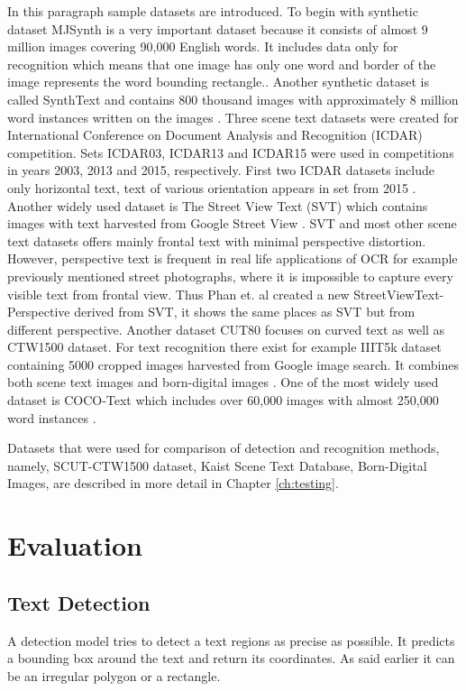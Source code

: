 In this paragraph sample datasets are introduced. To begin with synthetic dataset MJSynth is a very important dataset because it consists of almost 9 million images covering 90,000 English words. It includes data only for recognition which means that one image has only one word and border of the image  represents the word bounding rectangle.\cite{mjsynth}. Another synthetic dataset is called SynthText and contains 800 thousand images with approximately 8 million word instances written on the images \cite{synthtext}. Three scene text datasets were created for International Conference on Document Analysis and Recognition (ICDAR) competition. Sets ICDAR03, ICDAR13 and ICDAR15 were used in competitions in years 2003, 2013 and 2015, respectively. First two ICDAR datasets include only horizontal text, text of various orientation appears  in set from 2015 \cite{raisi2020text}. Another widely used dataset is The Street View Text (SVT) which contains images with text harvested from Google Street View \cite{svt}. SVT and most other scene text datasets offers mainly frontal text with minimal perspective distortion. However, perspective text is frequent in real life applications of OCR for example previously mentioned street photographs, where it is impossible to capture every visible text from frontal view. Thus Phan et. al \cite{svtp} created a new StreetViewText-Perspective derived from SVT, it shows the same places as SVT but from different perspective. Another dataset CUT80 focuses on curved text as well as CTW1500 dataset. For text recognition there exist for example IIIT5k dataset containing 5000 cropped images harvested from Google image search. It combines both scene text images and born-digital images \cite{IIIT}. One of the most widely used dataset is COCO-Text which includes over 60,000 images with almost 250,000 word instances \cite{coco}.

Datasets that were used for comparison of detection and recognition methods, namely, SCUT-CTW1500 dataset, Kaist Scene Text Database, Born-Digital Images, are described in more detail in Chapter \ref{ch:testing}. 

\section{Evaluation}

\subsection*{Text Detection}
A detection model tries to detect a text regions as precise as possible. It predicts a bounding box around the text and return its coordinates. As said earlier it can be an irregular polygon or a rectangle.

